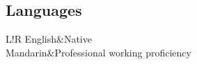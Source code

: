 \documentclass[10pt]{article}
\newcommand\VRule{\color{lightgray}\vrule width 0.5pt}
\begin{document}
\begin{CJK}{UTF8}{gbsn}
\section*{Languages}
\begin{tabular}{L!{\VRule}R}
    English&Native\\
    Mandarin&Professional working proficiency\\
\end{tabular}

\end{CJK}
\end{document}
